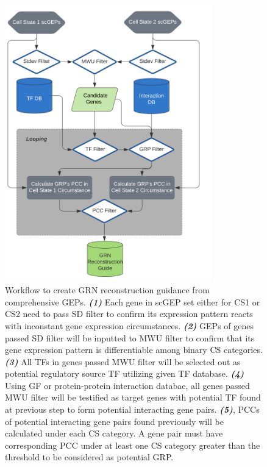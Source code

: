 \documentclass[fleqn,10pt]{wlscirep}
\begin{document}
\begin{figure}[ht]
\centering
\includegraphics[width=0.8\linewidth, height=12cm, keepaspectratio,]{image/Kirke.png}
\caption{
Workflow to create GRN reconstruction guidance from comprehensive GEPs.
\textbf{\emph{(1)}} Each gene in scGEP set either for CS1 or CS2 need to pass SD filter to confirm its expression pattern reacts with inconstant gene expression circumstances.
\textbf{\emph{(2)}} GEPs of genes passed SD filter will be inputted to MWU filter to confirm that its gene expression pattern is differentiable among binary CS categories.
\textbf{\emph{(3)}} All TFs in genes passed MWU filter will be selected out as potential regulatory source TF utilizing given TF database.
\textbf{\emph{(4)}} Using GF or protein-protein interaction databae, all genes passed MWU filter will be testified as target genes with potential TF found at previous step to form potential interacting gene pairs.
\textbf{\emph{(5)}}, PCCs of potential interacting gene pairs found previously will be calculated under each CS category. A gene pair must have corresponding PCC under at least one CS category greater than the threshold to be considered as potential GRP.
}
\label{kirke}
\end{figure}
\end{document}
